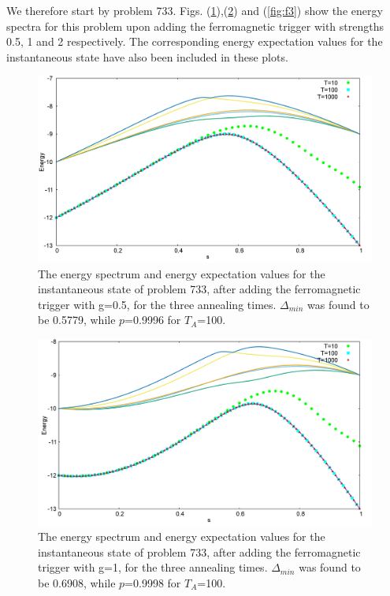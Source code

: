 \documentclass[../main.tex]{subfiles}
\begin{document}
We therefore start by problem 733. Figs. (\ref{fig:f1}),(\ref{fig:f2}) and (\ref{fig:f3}) show the energy spectra for this problem upon adding the ferromagnetic trigger with strengths 0.5, 1 and 2 respectively. The corresponding  energy expectation values for the instantaneous state have also been included in these plots. 
\begin{figure}[H]
\centering 
\includegraphics[scale=0.24]{733_s12_F_g0.png}
\caption{The energy spectrum and energy expectation values for the instantaneous state of problem 733, after adding the ferromagnetic trigger with g=0.5, for the three annealing times. $\Delta_{min}$ was found to be 0.5779, while $p$=0.9996 for $T_A$=100. }
\label{fig:f1}
\end{figure}
\begin{figure}[H]
\centering 
\includegraphics[scale=0.24]{733_s12_F_g1.png}
\caption{The energy spectrum and energy expectation values for the instantaneous state of problem 733, after adding the ferromagnetic trigger with g=1, for the three annealing times. $\Delta_{min}$ was found to be 0.6908, while $p$=0.9998 for $T_A$=100.}
\label{fig:f2}
\end{figure}
\end{document}
